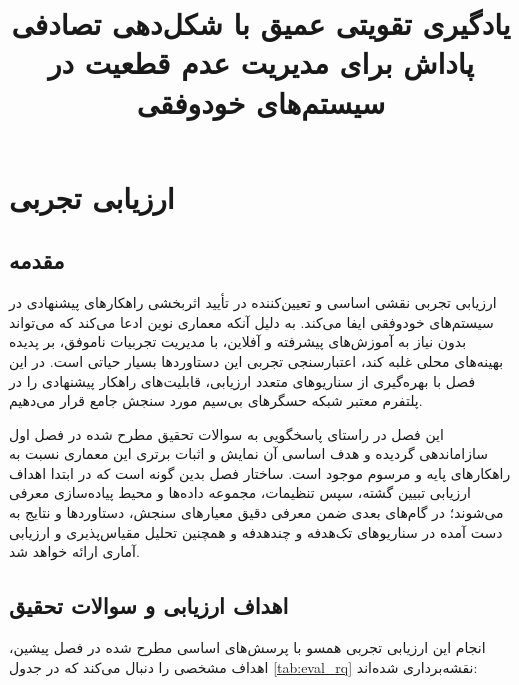 \documentclass[oneside,openany,phd]{TMU-Thesis}
\title{یادگیری تقویتی عمیق با شکل‌دهی تصادفی پاداش برای مدیریت عدم قطعیت در سیستم‌های خودوفقی}
\begin{document}
\AutoPersianDigits
{}

\setcounter{chapter}{4}

\chapter{ارزیابی تجربی}
\label{chap:evaluation}
\section{مقدمه}

ارزیابی تجربی نقشی اساسی و تعیین‌کننده در تأیید اثربخشی راهکارهای پیشنهادی در سیستم‌های خودوفقی ایفا می‌کند. به دلیل آنکه معماری نوین  ادعا می‌کند که می‌تواند بدون نیاز به آموزش‌های پیشرفته و آفلاین، با مدیریت تجربیات ناموفق، بر پدیده بهینه‌های محلی غلبه کند، اعتبارسنجی تجربی این دستاوردها بسیار حیاتی است. در این فصل با بهره‌گیری از سناریوهای متعدد ارزیابی، قابلیت‌های راهکار پیشنهادی را در پلتفرم معتبر شبکه حسگرهای بی‌سیم  \cite{gerostathopoulos2019deltaiot} مورد سنجش جامع قرار می‌دهیم. 

این فصل در راستای پاسخگویی به سوالات تحقیق مطرح شده در فصل اول سازاماندهی گردیده و هدف اساسی آن نمایش و اثبات برتری این معماری نسبت به راهکارهای پایه و مرسوم موجود است. ساختار فصل بدین گونه است که در ابتدا اهداف ارزیابی تبیین گشته، سپس تنظیمات، مجموعه داده‌ها و محیط پیاده‌سازی معرفی می‌شوند؛ در گام‌های بعدی ضمن معرفی دقیق معیارهای سنجش، دستاوردها و نتایج به دست آمده در سناریوهای تک‌هدفه و چندهدفه و همچنین تحلیل مقیاس‌پذیری و ارزیابی آماری ارائه خواهد شد.

\section{اهداف ارزیابی و سوالات تحقیق}

انجام این ارزیابی تجربی همسو با پرسش‌های اساسی مطرح شده در فصل پیشین، اهداف مشخصی را دنبال می‌کند که در جدول \ref{tab:eval_rq} نقشه‌برداری شده‌اند:
\end{document}
